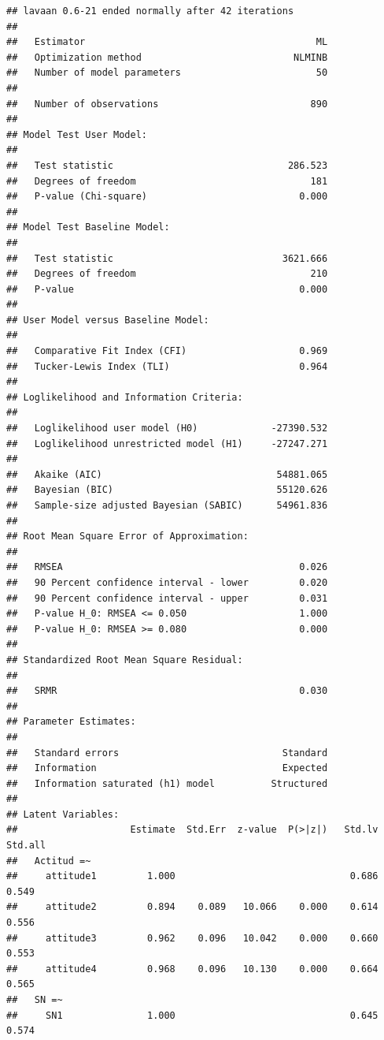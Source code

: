 \documentclass[
]{article}
\begin{document}
\begin{verbatim}
## lavaan 0.6-21 ended normally after 42 iterations
## 
##   Estimator                                         ML
##   Optimization method                           NLMINB
##   Number of model parameters                        50
## 
##   Number of observations                           890
## 
## Model Test User Model:
##                                                       
##   Test statistic                               286.523
##   Degrees of freedom                               181
##   P-value (Chi-square)                           0.000
## 
## Model Test Baseline Model:
## 
##   Test statistic                              3621.666
##   Degrees of freedom                               210
##   P-value                                        0.000
## 
## User Model versus Baseline Model:
## 
##   Comparative Fit Index (CFI)                    0.969
##   Tucker-Lewis Index (TLI)                       0.964
## 
## Loglikelihood and Information Criteria:
## 
##   Loglikelihood user model (H0)             -27390.532
##   Loglikelihood unrestricted model (H1)     -27247.271
##                                                       
##   Akaike (AIC)                               54881.065
##   Bayesian (BIC)                             55120.626
##   Sample-size adjusted Bayesian (SABIC)      54961.836
## 
## Root Mean Square Error of Approximation:
## 
##   RMSEA                                          0.026
##   90 Percent confidence interval - lower         0.020
##   90 Percent confidence interval - upper         0.031
##   P-value H_0: RMSEA <= 0.050                    1.000
##   P-value H_0: RMSEA >= 0.080                    0.000
## 
## Standardized Root Mean Square Residual:
## 
##   SRMR                                           0.030
## 
## Parameter Estimates:
## 
##   Standard errors                             Standard
##   Information                                 Expected
##   Information saturated (h1) model          Structured
## 
## Latent Variables:
##                    Estimate  Std.Err  z-value  P(>|z|)   Std.lv  Std.all
##   Actitud =~                                                            
##     attitude1         1.000                               0.686    0.549
##     attitude2         0.894    0.089   10.066    0.000    0.614    0.556
##     attitude3         0.962    0.096   10.042    0.000    0.660    0.553
##     attitude4         0.968    0.096   10.130    0.000    0.664    0.565
##   SN =~                                                                 
##     SN1               1.000                               0.645    0.574

\end{verbatim}
\end{document}
